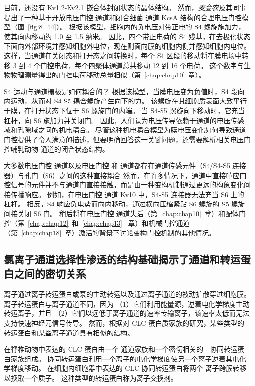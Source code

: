 目前，还没有 Kv1.2-Kv2.1 嵌合体封闭状态的晶体结构。 然而，\textit{麦金农}及其同事提出了一种基于开放电压门控  通道和闭合细菌  通道 KcsA 结构的合理电压门控模型（图~\ref{fig:8_14}）。
根据该模型，细胞内的负电压对带正电的 S4 螺旋施加力，使其向内移动约 1.0 至 1.5 纳米。
因此，四个带正电荷的 S4 残基，在去极化状态下面向外部环境并感知细胞外电位，现在则面向膜的细胞内侧并感知细胞内电位。
这样，当通道在关闭态和打开态之间转换时，每个 S4 区段的移动将在膜电场中转移 3 到 4 个门控电荷，每个四聚体通道总共移动 12 到 16 个电荷。 
这个数字与生物物理测量得出的门控电荷移动总量相似（第~\ref{chap:chap10}~章）。


S4 运动与通道栅极是如何耦合的？
根据该模型，当膜电压变为负值时，S4 段向内运动，从而对 S4-S5 耦合螺旋产生向下的力。
该螺旋在其细胞质表面大致平行于膜，在打开状态下位于 S6 螺旋门的内端。
当 S4-S5 螺旋向下移动时，它充当杠杆，向 S6 施加力并关闭门。
因此，人们认为电压传导依赖于通道的电压传感域和孔隙域之间的机电耦合。
尽管这种机电耦合模型为膜电压变化如何导致通道门控提供了令人满意的描述，但要明确回答这一关键问题，还需要解析相关电压门控哺乳动物  通道的闭合状态结构。


大多数电压门控  通道以及电压门控  和  通道都存在通道传感元件（S4/S4-S5 连接器）与孔门（S6）之间的这种直接耦合
然而，在许多情况下，通道中直接响应门控信号的元件并不与通道门直接接触，而是由一种变构机制通过更远的构象变化间接传播响应。
例如，在电压门控  通道 Kv10 中，S4-S5 连接器无法充当 S6 上的杠杆。
相反，S4 响应负电势而向内移动，通过横向压缩紧贴 S6 螺旋的 S5 螺旋间接关闭 S6 门。
稍后将在电压门控  通道失活（第~\ref{chap:chap10}~章）和配体门控（第~\ref{chap:chap12}~和~\ref{chap:chap13}~ 章）和机械门控通道（第~\ref{chap:chap18}~章）激活的背景下讨论变构门控机制的其他情况。



\subsection{氯离子通道选择性渗透的结构基础揭示了通道和转运蛋白之间的密切关系}

离子通过离子转运蛋白或泵的主动转运以及通过离子通道的被动扩散穿过细胞膜。
离子转运蛋白与离子通道不同，因为
（1）它们利用能量源，逆着电化学梯度主动转运离子，并且
（2）它们以远低于离子通道的速率传输离子，该速率太低而无法支持快速神经元信号传导。
然而，根据对 CLC 蛋白质家族的研究，某些类型的转运蛋白和某些离子通道具有相似的结构。


在脊椎动物中表达的 CLC 蛋白由一个  通道家族和一个密切相关的 - 协同转运蛋白家族组成。
协同转运蛋白利用一个离子的电化学梯度使另一个离子逆着其电化学梯度移动。
在细胞内细胞器中表达的 CLC  协同转运蛋白将两个  离子跨膜转移以换取一个质子。
这种类型的转运蛋白称为离子交换剂。


